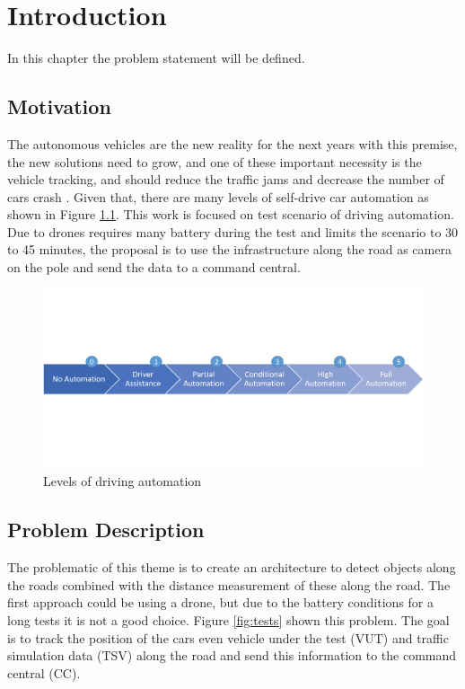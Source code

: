 \chapter{Introduction} \label{introducao}
In this chapter the problem statement will be defined. 
\section{Motivation}

The autonomous vehicles are the new reality for the next years with this premise, the new solutions need to grow, and one of these important necessity is the vehicle tracking, and should reduce the traffic jams and decrease the number of cars crash \cite{bonnefon2016social}. Given that, there are many levels of self-drive car automation as shown in Figure \ref{fig:automation}. This work is focused on test scenario of  driving automation. Due to drones requires many battery during the test and limits the scenario to 30 to 45 minutes, the proposal is to use the infrastructure along the road as camera on the pole and send the data to a command central.

\begin{figure}[H]
\centering
\includegraphics[scale=0.55]{imagens/diagrama_levels.png}
\caption{Levels of driving automation}
\label{fig:automation}
\end{figure}

\section{Problem Description}

The problematic of this theme is to create an architecture to detect objects along the roads combined with the distance measurement of these along the road. The first approach could be using a drone, but due to the battery conditions for a long tests it is not a good choice. Figure \ref{fig:tests} shown this problem. The goal is to track the position of the cars even vehicle under the test (VUT) and traffic simulation data (TSV) along the road and send this information to the command central (CC). 

